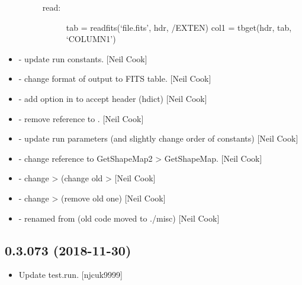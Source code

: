 \documentclass[a4paper,10pt,english]{report}
\begin{document}
\begin{itemize}
\begin{description}
\begin{description}
\item[{read:}] \leavevmode
tab = readfits(‘file.fits’, hdr, /EXTEN)
col1 = tbget(hdr, tab, ‘COLUMN1’)

\end{description}

\end{description}

\item {} 
 - update  run constants. {[}Neil Cook{]}

\item {} 
 - change format of output to FITS table. {[}Neil Cook{]}

\item {} 
 - add option in  to accept header (hdict)
{[}Neil Cook{]}

\item {} 
 - remove reference to . {[}Neil
Cook{]}

\item {} 
 - update run parameters (and slightly change order
of constants) {[}Neil Cook{]}

\item {} 
 - change reference to GetShapeMap2 \textendash{}\textgreater{}
GetShapeMap. {[}Neil Cook{]}

\item {} 
 - change  \textendash{}\textgreater{}  (change old
 \textendash{}\textgreater{}  {[}Neil Cook{]}

\item {} 
 - change  \textendash{}\textgreater{} 
(remove old one) {[}Neil Cook{]}

\item {} 
 - renamed from  (old code
moved to ./misc) {[}Neil Cook{]}

\end{itemize}


\subsection{0.3.073 (2018-11-30)}
\label{\detokenize{misc/changelog:id250}}\begin{itemize}
\item {} 
Update test.run. {[}njcuk9999{]}

\end{itemize}
\end{document}
